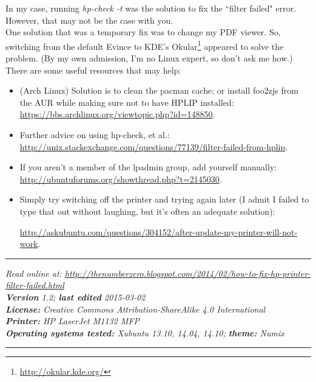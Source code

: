 \documentclass[12pt, a4paper]{article}
\begin{document}
In my case, running \emph{hp-check -t} was the solution to fix the ``filter failed" error. However, that may not be the case with you.\\

\noindent One solution that was a temporary fix was to change my PDF viewer. So, switching from the default Evince to KDE's Okular\footnote{\url{http://okular.kde.org/}} appeared to solve the problem. (By my own admission, I'm no Linux expert, so don't ask me how.)\\

\noindent There are some useful resources that may help:

\begin{itemize}
\item (Arch Linux) Solution is to clean the pacman cache; or install foo2zjs from the AUR while making sure not to have HPLIP installed: \url{https://bbs.archlinux.org/viewtopic.php?id=148850}.
\item Further advice on using hp-check, et al.: \url{http://unix.stackexchange.com/questions/77139/filter-failed-from-hplip}.
\item If you aren't a member of the lpadmin group, add yourself manually: \url{http://ubuntuforums.org/showthread.php?t=2145030}.
\item Simply try switching off the printer and trying again later (I admit I failed to type that out without laughing, but it's often an adequate solution): \begin{sloppypar}\url{http://askubuntu.com/questions/304152/after-update-my-printer-will-not-work}.\end{sloppypar}
\end{itemize}

\vspace{4cm}
\hrule
\noindent \center \emph{Read online at: \url{http://thenumberzero.blogspot.com/2014/02/how-to-fix-hp-printer-filter-failed.html}\\
\textbf{Version} 1.2; \textbf{last edited} 2015-03-02\\
\textbf{License:} Creative Commons Attribution-ShareAlike 4.0 International\\
\textbf{Printer:} HP LaserJet M1132 MFP\\
\textbf{Operating systems tested:} Xubuntu 13.10, 14.04, 14.10; \textbf{theme:} Numix}
\vspace{1em}
\hrule
\end{document}
